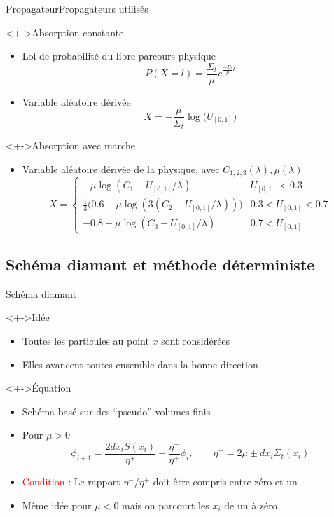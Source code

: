 \documentclass[17pt]{beamer}
\newenvironment{blockitemize}[1]{
  \begin{block}<+->{#1}
    \begin{itemize}
    }{
    \end{itemize}
  \end{block}
}
\newcommand{\U}{U_{[0,1]}}
\begin{document}
\begin{frame}{Propagateur}{Propagateurs utilisés}
  \begin{blockitemize}{Absorption constante}
  \item Loi de probabilité du libre parcours physique
    \[ P(X=l) = \frac{\Sigma_t}{\mu} e^{\frac{-\Sigma_t}{\mu}l} \]
  \item Variable aléatoire dérivée 
    \[ X = -\frac{\mu}{\Sigma_t}\log\big(\U\big) \]
  \end{blockitemize}
  \vspace{-10pt}
  \begin{blockitemize}{Absorption avec marche}
  \item Variable aléatoire dérivée de la physique, avec $C_{1, 2, 3}(\lambda), \mu(\lambda)$ 
    \[ X =
      \begin{cases}
        -\mu \log(C_1- \U/\lambda)                                  & \U<0.3\\
        \tfrac{1}{3} \big(0.6 - \mu \log(3(C_2 - \U/\lambda))\big)  & 0.3<\U<0.7\\
        -0.8 - \mu \log(C_3 - \U/\lambda)                           & 0.7<\U
      \end{cases}
    \]
  \end{blockitemize}
\end{frame}


\subsection{Schéma diamant et méthode déterministe}

\begin{frame}{Schéma diamant}
  \begin{blockitemize}{Idée}
  \item Toutes les particules au point $x$ sont considérées
  \item Elles avancent toutes ensemble dans la bonne direction
  \end{blockitemize}
  \begin{blockitemize}{Équation}
  \item Schéma basé sur des ``pseudo'' volumes finis
  \item Pour $\mu>0$
    \[
      \phi_{i+1} = \frac{2 dx_i S(x_i)}{\eta^+} +
      \frac{\eta^-}{\eta^+}\phi_{i}, \qquad \eta^\pm = 2\mu \pm dx_i\Sigma_t(x_i)
    \]
  \item \textcolor{red}{Condition} : Le rapport $\eta^-/\eta^+$ doit être compris entre zéro et un
  \item Même idée pour $\mu<0$ mais on parcourt les $x_i$ de un à zéro
  \end{blockitemize}
\end{frame}
\end{document}

